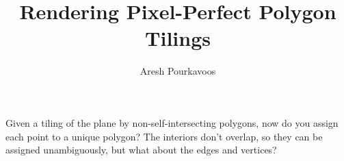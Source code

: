 \documentclass{article}
\begin{document}
\title{Rendering Pixel-Perfect Polygon Tilings}
\author{Aresh Pourkavoos}
\maketitle

Given a tiling of the plane by non-self-intersecting polygons,
now do you assign each point to a unique polygon?
The interiors don't overlap, so they can be assigned unambiguously,
but what about the edges and vertices?
\end{document}
